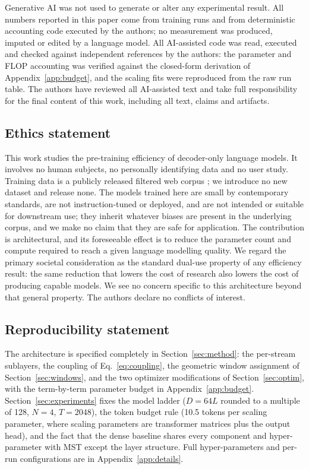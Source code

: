 \documentclass{article}
\newcommand{\dmodel}{D}
\newcommand{\nsub}{N}
\begin{document}
Generative AI was not used to generate or alter any experimental result. All
numbers reported in this paper come from training runs and from deterministic
accounting code executed by the authors; no measurement was produced, imputed or
edited by a language model. All AI-assisted code was read, executed and checked
against independent references by the authors: the parameter and FLOP accounting
was verified against the closed-form derivation of Appendix~\ref{app:budget},
and the scaling fits were reproduced from the raw run table. The authors have
reviewed all AI-assisted text and take full responsibility for the final content
of this work, including all text, claims and artifacts.

\subsection*{Ethics statement}

This work studies the pre-training efficiency of decoder-only language models.
It involves no human subjects, no personally identifying data and no user study.
Training data is a publicly released filtered web corpus \citep{penedo2024fineweb};
we introduce no new dataset and release none. The models trained here are small
by contemporary standards, are not instruction-tuned or deployed, and are not
intended or suitable for downstream use; they inherit whatever biases are present
in the underlying corpus, and we make no claim that they are safe for
application. The contribution is architectural, and its foreseeable effect is to
reduce the parameter count and compute required to reach a given language
modelling quality. We regard the primary societal consideration as the standard
dual-use property of any efficiency result: the same reduction that lowers the
cost of research also lowers the cost of producing capable models. We see no
concern specific to this architecture beyond that general property. The authors
declare no conflicts of interest.

\subsection*{Reproducibility statement}

The architecture is specified completely in Section~\ref{sec:method}: the
per-stream sublayers, the coupling of Eq.~\ref{eq:coupling}, the geometric
window assignment of Section~\ref{sec:windows}, and the two optimizer
modifications of Section~\ref{sec:optim}, with the term-by-term parameter budget
in Appendix~\ref{app:budget}. Section~\ref{sec:experiments} fixes the model
ladder ($\dmodel = 64L$ rounded to a multiple of 128, $\nsub{=}4$, $T{=}2048$),
the token budget rule (10.5 tokens per scaling parameter, where scaling
parameters are transformer matrices plus the output head), and the fact that the
dense baseline shares every component and hyper-parameter with MST except the
layer structure. Full hyper-parameters and per-run configurations are in
Appendix~\ref{app:details}.
\end{document}
